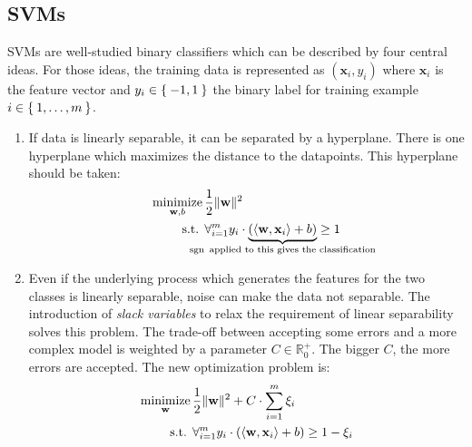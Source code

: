 
\subsection{SVMs}\label{subsec:trad-SVM}%

\Glspl{SVM} are well-studied binary classifiers which can be described by four
central ideas. For those ideas, the training data is represented as
$(\mathbf{x}_i, y_i)$ where $\mathbf{x}_i$ is the feature vector and $y_i \in
\Set{-1, 1}$ the binary label for training example $i \in \Set{1, \dots, m}$.


\begin{enumerate}
    \item If data is linearly separable, it can be separated by a hyperplane.
          There is one hyperplane which maximizes the distance to the
          datapoints. This hyperplane should be taken:\\
          \begin{equation*}
          \begin{aligned}
              \minimize_{\mathbf{w}, b}\,&\frac{1}{2} \|\mathbf{w}\|^2\\
              \text{s.t. }& \forall_{i=1}^m y_i \cdot \underbrace{(\langle \mathbf{w}, \mathbf{x}_i\rangle + b)}_{\mathclap{\sgn \text{ applied to this gives the classification}}} \geq 1
          \end{aligned}
          \end{equation*}
    \item Even if the underlying process which generates the features for the
          two classes is linearly separable, noise can make the data not
          separable. The introduction of \textit{slack variables} to relax the
          requirement of linear separability solves this problem. The trade-off
          between accepting some errors and a more complex model is weighted by
          a parameter $C \in \mathbb{R}_0^+$. The bigger $C$, the more errors
          are accepted. The new optimization problem is:
          \begin{equation*}
          \begin{aligned}
              \operatorname*{minimize}_{\mathbf{w}}\,&\frac{1}{2} \|\mathbf{w}\|^2 + C \cdot \sum_{i=1}^m \xi_i\\
              \text{s.t. }& \forall_{i=1}^m y_i \cdot (\langle \mathbf{w}, \mathbf{x}_i\rangle + b) \geq 1 - \xi_i
          \end{aligned}
          \end{equation*}

\end{enumerate}
